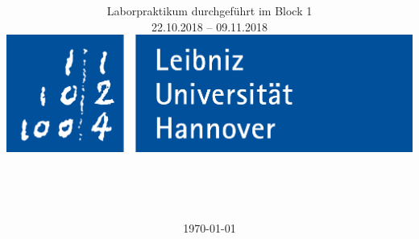 
\title{\Versuchsname $ $ \Versuchsnummer}
\subtitle{Laborpraktikum durchgeführt im Block 1\\
22.10.2018 – 09.11.2018\vspace{1cm}\\ \includegraphics[width=.75\linewidth]{IMAGE/luh_logo.png}}
\author{%
\authA\\
\matA
\and
\authB\\
\matB
}
\date{\today}
%

\pagestyle{empty} %
\setcounter{page}{0} %
\maketitle %

\newpage 

